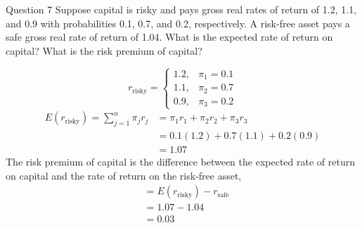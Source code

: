 \documentclass[a4paper]{article}
\newif\IfInSansMode
\numberwithin{equation}{section}
\numberwithin{figure}{section}
\begin{document}
	\begin{questionbox}{Question 7}
		Suppose capital is risky and pays gross real rates of return of 1.2, 1.1, and 0.9 with probabilities 0.1, 0.7, and 0.2, respectively. A risk-free asset pays a safe gross real rate of return of 1.04. What is the expected rate of return on capital? What is the risk premium of capital?
		\begin{explanationbox}
			\[
				r_\text{risky}=
				\begin{cases}
					1.2, &\pi_1=0.1\\
					1.1, &\pi_2=0.7\\
					0.9, &\pi_3=0.2
				\end{cases}
			\]
			\begin{align*}
				E(r_\text{risky}) =\sum_{j=1}^n \pi_j r_j &= \pi_1 r_1 + \pi_2 r_2 + \pi_3 r_3\\
				&= 0.1(1.2) + 0.7(1.1) +0.2(0.9)\\
				&= 1.07
			\end{align*}
			The risk premium of capital is the difference between the expected rate of return on capital and the rate of return on the risk-free asset,
			\begin{align*}
				&= E(r_\text{risky}) - r_\text{safe}\\
				&= 1.07-1.04\\
				&= 0.03
			\end{align*}
		\end{explanationbox}
	\end{questionbox}
\end{document}
